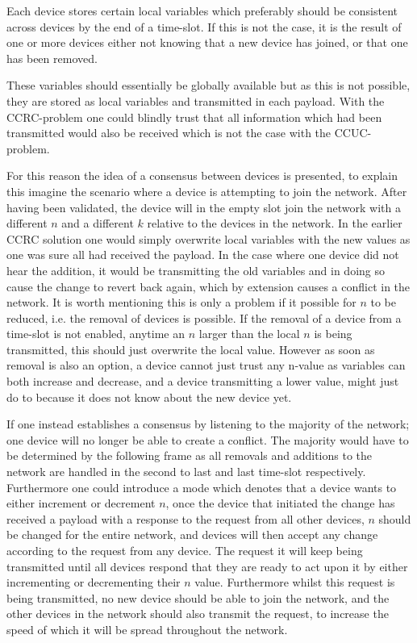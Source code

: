 Each device stores certain local variables which preferably should be consistent across devices by the end of a time-slot.
If this is not the case, it is the result of one or more devices either not knowing that a new device has joined, or that one has been removed.

These variables should essentially be globally available but as this is not possible, they are stored as local variables and transmitted in each payload.
With the CCRC-problem one could blindly trust that all information which had been transmitted would also be received which is not the case with the CCUC-problem.

\bigskip \noindent
For this reason the idea of a consensus between devices is presented, to explain this imagine the scenario where a device is attempting to join the network.
After having been validated, the device will in the empty slot join the network with a different $n$ and a different $k$ relative to the devices in the network.
In the earlier CCRC solution one would simply overwrite local variables with the new values as one was sure all had received the payload.
In the case where one device did not hear the addition, it would be transmitting the old variables and in doing so cause the change to revert back again, which by extension causes a conflict in the network.
It is worth mentioning this is only a problem if it possible for $n$ to be reduced, i.e. the removal of devices is possible.
If the removal of a device from a time-slot is not enabled, anytime an $n$ larger than the local $n$ is being transmitted, this should just overwrite the local value. 
However as soon as removal is also an option, a device cannot just trust any n-value as variables can both increase and decrease, and a device transmitting a lower value, might just do to because it does not know about the new device yet.

If one instead establishes a consensus by listening to the majority of the network; one device will no longer be able to create a conflict.
The majority would have to be determined by the following frame as all removals and additions to the network are handled in the second to last and last time-slot respectively.
Furthermore one could introduce a mode which denotes that a device wants to either increment or decrement $n$, once the device that initiated the change has received a payload with a response to the request from all other devices, $n$ should be changed for the entire network, and devices will then accept any change according to the request from any device.
The request it will keep being transmitted until all devices respond that they are ready to act upon it by either incrementing or decrementing their $n$ value.
Furthermore whilst this request is being transmitted, no new device should be able to join the network, and the other devices in the network should also transmit the request, to increase the speed of which it will be spread throughout the network.